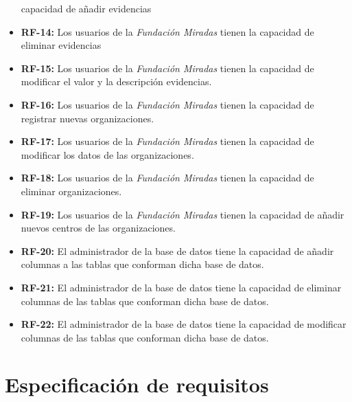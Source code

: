 \begin{itemize}
	capacidad de añadir evidencias
	\item \textbf{RF-14:} Los usuarios de la \textit{Fundación Miradas} tienen la
	capacidad de eliminar evidencias
	\item \textbf{RF-15:} Los usuarios de la \textit{Fundación Miradas} tienen la
	capacidad de modificar el valor y la descripción evidencias.
	\item \textbf{RF-16:} Los usuarios de la \textit{Fundación Miradas} tienen
	la capacidad de registrar nuevas organizaciones.
	\item \textbf{RF-17:} Los usuarios de la \textit{Fundación Miradas} tienen
	la capacidad de modificar los datos de las organizaciones.
	\item \textbf{RF-18:} Los usuarios de la \textit{Fundación Miradas} tienen
	la capacidad de eliminar organizaciones.
	\item \textbf{RF-19:} Los usuarios de la \textit{Fundación Miradas} tienen
	la capacidad de añadir nuevos centros de las organizaciones.
	\item \textbf{RF-20:} El administrador de la base de datos tiene la
	capacidad de añadir columnas a las tablas que conforman dicha base de datos.
	\item \textbf{RF-21:} El administrador de la base de datos tiene la
	capacidad de eliminar columnas de las tablas que conforman dicha base de datos.
	\item \textbf{RF-22:} El administrador de la base de datos tiene la
	capacidad de modificar columnas de las tablas que conforman dicha base de datos.
\end{itemize}
\section{Especificación de requisitos}

